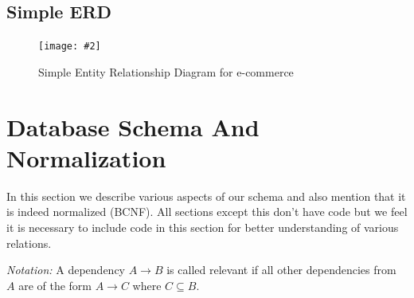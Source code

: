\documentclass[a4paper,12pt]{article}
\newcommand{\iph}[2]{
    \texttt{[image: \#2]}
}
\newcommand{\ita}[1]{
    \textit{#1}
}
\newcommand{\dph}[3]{
\begin{figure}[H]
  \centering
  \iph{#1}{#2}
  \caption{#3}
\end{figure}
}
\begin{document}
\subsection{Simple ERD}

\dph{1}{ERDF}{Simple Entity Relationship Diagram for e-commerce}

\section{Database Schema And Normalization}
In this section we describe various aspects of our schema and also mention that it is indeed normalized (BCNF). All sections except this don't have code but we feel it is necessary to include code in this section for better understanding of various relations. 

\ita{Notation: }A dependency $A \rightarrow B$ is called relevant if all other dependencies from $A$ are of the form $A \rightarrow C$ where $C \subseteq B$.
\end{document}
